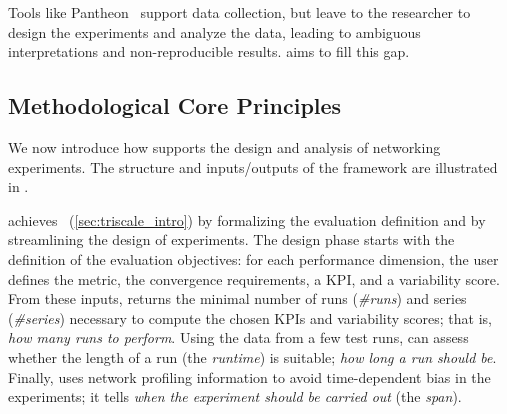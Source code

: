 Tools like Pantheon~\cite{yan18pantheon} support data collection, but leave to the researcher to design the experiments and analyze the data, leading to ambiguous interpretations and non-reproducible results.
\triscale aims to fill this gap.


\subsection{Methodological Core Principles}
\label{subsec:triscale_overview}

We now introduce how \triscale supports the design and analysis of networking experiments. The structure and inputs/outputs of the \triscale framework are illustrated in .

\triscale achieves ~(\cref{sec:triscale_intro}) by formalizing the evaluation definition and by streamlining the design of experiments.
The design phase starts with the definition of the evaluation objectives: for each performance dimension, the user defines the metric, the convergence requirements, a KPI, and a variability score.
From these inputs, \triscale returns the minimal number of runs (\emph{\#runs}) and \mbox{series} (\emph{\#series}) necessary to compute the chosen KPIs and variability scores; that is, \emph{how many runs to perform}.
Using the data from a few test runs, \triscale can assess whether the length of a run (the \emph{runtime}) is suitable; \ie \emph{how long a run should be}.
Finally, \triscale uses network profiling information to avoid time-dependent bias in the experiments; \ie it tells \emph{when the experiment should be carried out} (the \emph{span}).


